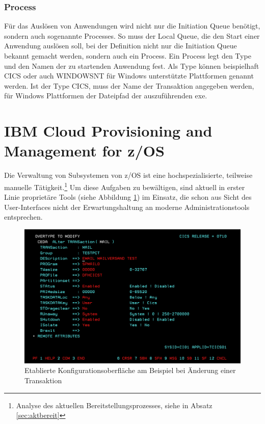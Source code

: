 \subsubsection{Process}
Für das Auslösen von Anwendungen wird nicht nur die Initiation Queue benötigt, sondern auch sogenannte \glqq Processes\grqq.
So muss der Local Queue, die den Start einer Anwendung auslösen soll, bei der Definition nicht nur die Initiation Queue bekannt gemacht werden, sondern auch ein Process.
Ein Process legt den \glqq Type\grqq{} und den Namen der zu startenden Anwendung fest.
Als Type können beispielhaft CICS oder auch WINDOWSNT für Windows unterstützte Plattformen genannt werden.
Ist der Type CICS,  muss der Name der Transaktion angegeben werden, für Windows Plattformen der Dateipfad der auszuführenden exe.
\cite[Kap. 4.5]{Aranha.2013}

\section{\glqq IBM Cloud Provisioning and Management for z/OS\grqq}\label{sec:tool}
Die Verwaltung von Subsystemen von z/OS ist eine hochspezialisierte, teilweise manuelle Tätigkeit.\footnote{Analyse des aktuellen Bereitstellungsprozesses, siehe in Absatz \ref{sec:aktbereit}}
Um diese Aufgaben zu bewältigen, sind aktuell in erster Linie proprietäre Tools (siehe Abbildung \ref{fig:configalt}) im Einsatz, die schon aus Sicht des User-Interfaces nicht der Erwartungshaltung an moderne Administrationstools entsprechen.

\begin{figure}[h]
\centering
\includegraphics[width=\textwidth]{figures/Transaktionbearbeitenalt.PNG}
\caption{Etablierte Konfigurationsoberfläche am Beispiel bei Änderung einer Transaktion}
\label{fig:configalt}
\end{figure}

